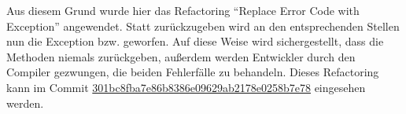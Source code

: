Aus diesem Grund wurde hier das Refactoring \enquote{Replace Error Code with Exception} angewendet. Statt  zurückzugeben wird an den entsprechenden Stellen nun die Exception \href{https://github.com/anditru/quickie/blob/d39394fa4590c1fd7fadc7974ee37c5416c0fc93/0-quickie-plugin-scraper/src/main/java/org/pinkcrazyunicorn/quickie/plugins/scraper/exceptions/FailedToParseRecipe.java}{} bzw. \href{https://github.com/anditru/quickie/blob/d39394fa4590c1fd7fadc7974ee37c5416c0fc93/0-quickie-plugin-scraper/src/main/java/org/pinkcrazyunicorn/quickie/plugins/scraper/exceptions/FailedToParseIngredient.java}{} geworfen. Auf diese Weise wird sichergestellt, dass die Methoden niemals  zurückgeben, außerdem werden Entwickler durch den Compiler gezwungen, die beiden Fehlerfälle zu behandeln. Dieses Refactoring kann im Commit \href{https://github.com/anditru/quickie/commit/301bc8fba7e86b8386e09629ab2178e0258b7e78}{301bc8fba7e86b8386e09629ab2178e0258b7e78} eingesehen werden.
